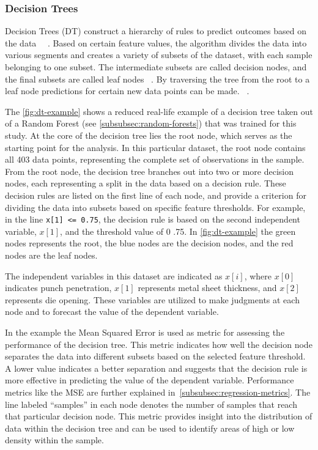 \subsubsection{Decision Trees}
Decision Trees (DT) construct a hierarchy of rules to predict outcomes based on the
data
~\cite[p. 70]{muller2016introduction}~\cite[p. 253]{shaik2019brief}.
Based on certain feature values, the algorithm divides the data into various segments and creates a variety of
subsets of the dataset, with each sample belonging to one subset.
The intermediate subsets are called decision nodes, and the final subsets are called leaf nodes
~\cite[p. 358]{geron2022hands}.
By traversing the tree from the root to a leaf node predictions for certain new data points can be made.
~\cite[p. 74]{muller2016introduction}.

The \cref{fig:dt-example} shows a reduced real-life example of a decision tree taken out of a Random Forest
(see \cref{subsubsec:random-forests}) that was trained for this study.
At the core of the decision tree lies the root node, which serves as the starting point for the analysis.
In this particular dataset, the root node contains all 403 data points, representing the complete set of observations
in the sample.
From the root node, the decision tree branches out into two or more decision nodes, each representing a split in the
data based on a decision rule.
These decision rules are listed on the first line of each node, and provide a criterion for dividing the data into
subsets based on specific feature thresholds.
For example, in the line \texttt{x[1] <= 0.75}, the decision rule is based on the second independent variable,
$x[1]$, and the threshold value of 0 .75.
In \cref{fig:dt-example} the green nodes represents the root, the blue nodes are the decision nodes, and the red
nodes are the leaf nodes.

The independent variables in this dataset are indicated as $x[i]$, where $x[0]$ indicates punch penetration, $x[1]$
represents metal sheet thickness, and $x[2]$ represents die opening.
These variables are utilized to make judgments at each node and to forecast the value of the dependent variable.

In the example the Mean Squared Error is used as metric for assessing the performance of the decision tree.
This metric indicates how well the decision node separates the data into different subsets based on the selected
feature threshold.
A lower value indicates a better separation and suggests that the decision rule is more effective in predicting the
value of the dependent variable.
Performance metrics like the \ac{MSE} are further explained in~\cref{subsubsec:regression-metrics}.
The line labeled ``samples'' in each node denotes the number of samples that reach that particular decision node.
This metric provides insight into the distribution of data within the decision tree and can be used to identify
areas of high or low density within the sample.

